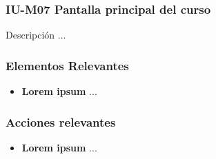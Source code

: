 
\subsubsection{IU-M07 Pantalla principal del curso}

 Descripción ...


\subsubsection{Elementos Relevantes}

    \begin{itemize}
    \item {\bf Lorem ipsum}
        ...
    \end{itemize}

\subsubsection{Acciones relevantes}

    \begin{itemize}
    \item {\bf Lorem ipsum}
        ...
    \end{itemize}

\clearpage
